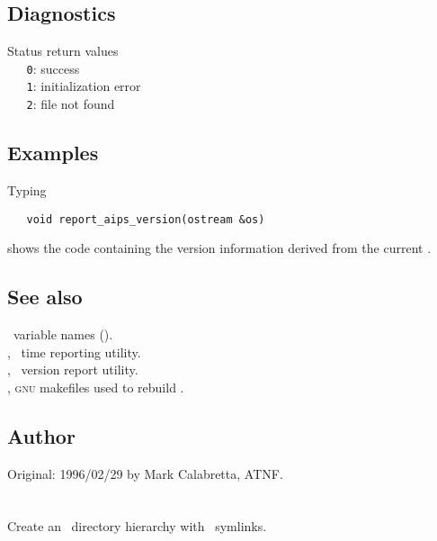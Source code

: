 \subsection*{Diagnostics}
 
Status return values
\\ \verb+   0+: success
\\ \verb+   1+: initialization error
\\ \verb+   2+:  file not found
 
\subsection*{Examples}
 
Typing

\begin{verbatim}
   void report_aips_version(ostream &os)
\end{verbatim}

\noindent
shows the code containing the version information derived from the current
.
 
\subsection*{See also}
 
\aipspp\ variable names ().\\
, \aipspp\ time reporting utility.\\
, \aipspp\ version report utility.\\
, \textsc{gnu} makefiles used to rebuild \aipspp.
 
\subsection*{Author}
 
Original: 1996/02/29 by Mark Calabretta, ATNF.


\newpage
\section{}
\label{mktree}

Create an \aipspp\ directory hierarchy with \rcs\ symlinks.

